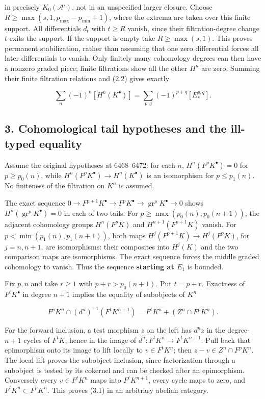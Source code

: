 \documentclass[11pt]{article}
\begin{document}
in precisely \(K_0(\mathcal A')\), not in an unspecified larger closure. Choose \(R\geq\max(s,1,p_{\max}-p_{\min}+1)\), where the extrema are taken over this finite support. All differentials \(d_t\) with \(t\geq R\) vanish, since their filtration-degree change \(t\) exits the support. If the support is empty take \(R\geq\max(s,1)\). This proves permanent stabilization, rather than assuming that one zero differential forces all later differentials to vanish. Only finitely many cohomology degrees can then have a nonzero graded piece; finite filtrations show all the other \(H^n\) are zero. Summing their finite filtration relations and (2.2) gives exactly

\[
\sum_n(-1)^n[H^n(K^\bullet)]
=\sum_{p,q}(-1)^{p+q}[E_s^{p,q}].             \tag{2.3}
\]

\subsection{3. Cohomological tail hypotheses and the ill-typed equality}\label{note-07-cohomological-tail-hypotheses-and-the-ill-typed-equality}

Assume the original hypotheses at 6468--6472: for each \(n\), \(H^n(F^pK^\bullet)=0\) for \(p\geq p_0(n)\), while \(H^n(F^pK^\bullet)\to H^n(K^\bullet)\) is an isomorphism for \(p\leq p_1(n)\). No finiteness of the filtration on \(K^n\) is assumed.

The exact sequence \(0\to F^{p+1}K^\bullet\to F^pK^\bullet\to\operatorname{gr}^pK^\bullet\to0\) shows \(H^n(\operatorname{gr}^pK^\bullet)=0\) in each of two tails. For \(p\geq\max(p_0(n),p_0(n+1))\), the adjacent cohomology groups \(H^n(F^pK)\) and \(H^{n+1}(F^{p+1}K)\) vanish. For \(p<\min(p_1(n),p_1(n+1))\), both maps \(H^j(F^{p+1}K)\to H^j(F^pK)\), for \(j=n,n+1\), are isomorphisms: their composites into \(H^j(K)\) and the two comparison maps are isomorphisms. The exact sequence forces the middle graded cohomology to vanish. Thus the sequence \textbf{starting at \(E_1\)} is bounded.

Fix \(p,n\) and take \(r\geq1\) with \(p+r>p_0(n+1)\). Put \(t=p+r\). Exactness of \(F^tK^\bullet\) in degree \(n+1\) implies the equality of subobjects of \(K^n\)

\[
F^pK^n\cap(d^n)^{-1}(F^tK^{n+1})
=F^tK^n+(Z^n\cap F^pK^n).                  \tag{3.1}
\]

For the forward inclusion, a test morphism \(z\) on the left has \(d^nz\) in the degree-\(n+1\) cycles of \(F^tK\), hence in the image of \(d^n:F^tK^n\to F^tK^{n+1}\). Pull back that epimorphism onto its image to lift locally to \(v\in F^tK^n\); then \(z-v\in Z^n\cap F^pK^n\). The local lift proves the subobject inclusion, since factorization through a subobject is tested by its cokernel and can be checked after an epimorphism. Conversely every \(v\in F^tK^n\) maps into \(F^tK^{n+1}\), every cycle maps to zero, and \(F^tK^n\subset F^pK^n\). This proves (3.1) in an arbitrary abelian category.
\end{document}
